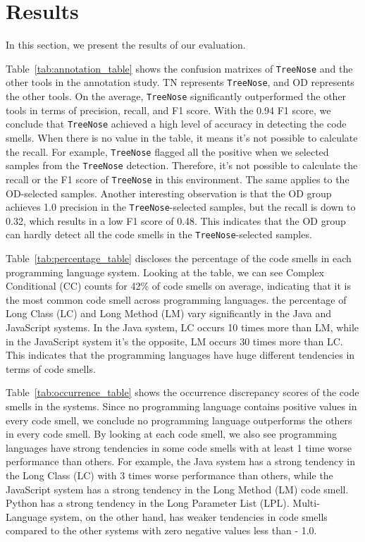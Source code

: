 

\section{Results}
\label{sec:results}

In this section, we present the results of our evaluation.


Table~\ref{tab:annotation_table} shows the confusion matrixes of \texttt{TreeNose} and the other tools in the annotation study. TN represents \texttt{TreeNose}, and OD represents the other tools.
On the average, \texttt{TreeNose} significantly outperformed the other tools in terms of precision, recall, and F1 score.
With the 0.94 F1 score, we conclude that \texttt{TreeNose} achieved a high level of accuracy in detecting the code smells.
When there is no value in the table, it means it's not possible to calculate the recall. For example, 
\texttt{TreeNose} flagged all the positive when we selected samples from the \texttt{TreeNose} detection. Therefore, it's not
possible to calculate the recall or the F1 score of \texttt{TreeNose} in this environment. The same applies to the OD-selected samples.
Another interesting observation is that the OD group achieves 1.0 precision in the \texttt{TreeNose}-selected samples, but the recall is down to 0.32,
which results in a low F1 score of 0.48. This indicates that the OD group can hardly detect all the code smells in the \texttt{TreeNose}-selected samples.

Table~\ref{tab:percentage_table} discloses the percentage of the code smells in each programming language system. Looking at the table, we can see Complex Conditional (CC)
counts for 42\% of code smells on average, indicating that it is the most common code smell across programming languages. 
the percentage of Long Class (LC) and Long Method (LM) vary significantly in the Java and JavaScript systems. In the Java system,
LC occurs 10 times more than LM, while in the JavaScript system it's the opposite, LM occurs 30 times more than LC. 
This indicates that the programming languages have huge different tendencies in terms of code smells.



Table~\ref{tab:occurrence_table} shows the occurrence discrepancy scores of the code smells in the systems. Since no programming language contains positive values in every code smell, 
we conclude no programming language outperforms the others in every code smell.
By looking at each code smell, we also see programming languages have strong tendencies in some code smells with at least 1 time worse performance than others. 
For example, the Java system has a strong tendency in the Long Class (LC) with 3 times worse performance than others, 
while the JavaScript system has a strong tendency in the Long Method (LM) code smell. Python has a strong tendency in the Long Parameter List (LPL).
Multi-Language system, on the other hand, has weaker tendencies in code smells compared to the other systems with zero negative values less than - 1.0.

